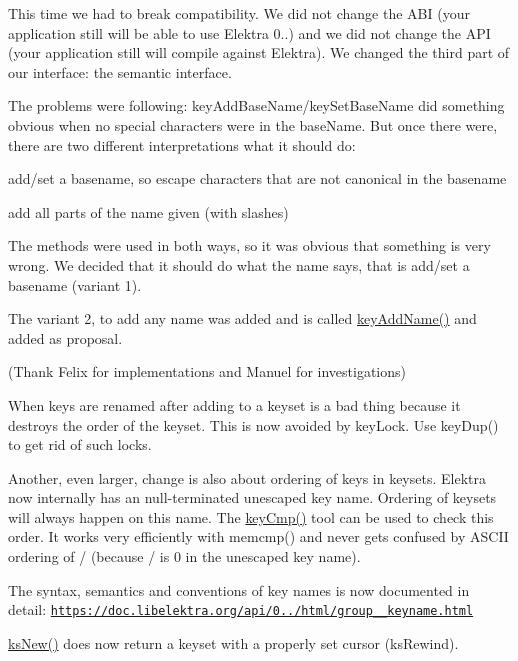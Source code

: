 This time we had to break compatibility. We did not change the A\+BI (your application still will be able to use Elektra 0..) and we did not change the A\+PI (your application still will compile against Elektra). We changed the third part of our interface\+: the semantic interface.

The problems were following\+: key\+Add\+Base\+Name/key\+Set\+Base\+Name did something obvious when no special characters were in the base\+Name. But once there were, there are two different interpretations what it should do\+:


\begin{DoxyEnumerate}
\item add/set a basename, so escape characters that are not canonical in the basename
\item add all parts of the name given (with slashes)
\end{DoxyEnumerate}

The methods were used in both ways, so it was obvious that something is very wrong. We decided that it should do what the name says, that is add/set a basename (variant 1).

The variant 2, to add any name was added and is called \hyperlink{group__keyname_gaa70593a2c772c4b7bc33423b9b10a270}{key\+Add\+Name()} and added as proposal.

(Thank Felix for implementations and Manuel for investigations)

When keys are renamed after adding to a keyset is a bad thing because it destroys the order of the keyset. This is now avoided by key\+Lock. Use key\+Dup() to get rid of such locks.

Another, even larger, change is also about ordering of keys in keysets. Elektra now internally has an null-\/terminated unescaped key name. Ordering of keysets will always happen on this name. The {\ttfamily \hyperlink{group__keytest_gaf6e66e12fe04d535a5d1c8218ced803e}{key\+Cmp()}} tool can be used to check this order. It works very efficiently with {\ttfamily memcmp()} and never gets confused by A\+S\+C\+II ordering of / (because / is 0 in the unescaped key name).

The syntax, semantics and conventions of key names is now documented in detail\+: \href{https://doc.libelektra.org/api/0.8.8/html/group__keyname.html}{\tt https\+://doc.\+libelektra.\+org/api/0../html/group\+\_\+\+\_\+keyname.\+html}

\hyperlink{group__keyset_ga671e1aaee3ae9dc13b4834a4ddbd2c3c}{ks\+New()} does now return a keyset with a properly set cursor (ks\+Rewind).


